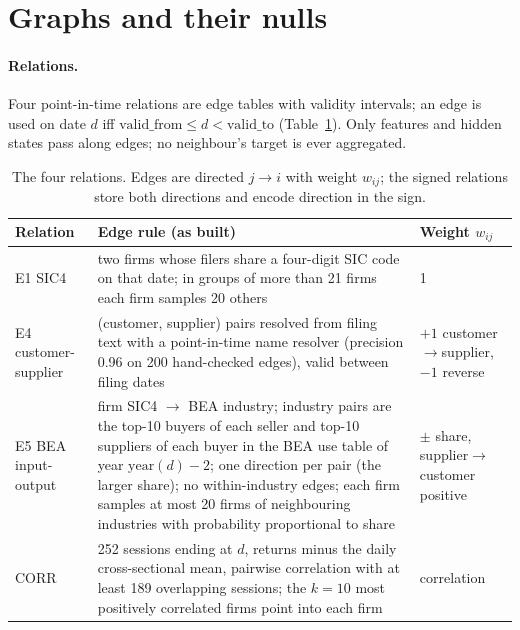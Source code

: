\section{Graphs and their nulls}\label{sec:graphs}

\paragraph{Relations.}
Four point-in-time relations are edge tables with validity intervals; an edge is used on date $d$ iff $\mathrm{valid\_from}\le d<\mathrm{valid\_to}$ (Table~\ref{tab:relations}). Only features and hidden states pass along edges; no neighbour's target is ever aggregated.

\begin{table}[t]
\centering\footnotesize
\setlength{\tabcolsep}{4pt}
\caption{The four relations. Edges are directed $j\to i$ with weight $w_{ij}$; the signed relations store both directions and encode direction in the sign.}
\label{tab:relations}
\begin{tabular}{@{}p{2.1cm}p{9.6cm}p{3.0cm}@{}}
\toprule
Relation & Edge rule (as built) & Weight $w_{ij}$ \\
\midrule
E1 SIC4 & two firms whose filers share a four-digit SIC code on that date; in groups of more than 21 firms each firm samples 20 others & 1 \\
E4 customer-supplier & (customer, supplier) pairs resolved from filing text with a point-in-time name resolver (precision 0.96 on 200 hand-checked edges), valid between filing dates & $+1$ customer$\to$supplier, $-1$ reverse \\
E5 BEA input-output & firm SIC4 $\to$ BEA industry; industry pairs are the top-10 buyers of each seller and top-10 suppliers of each buyer in the BEA use table of year $\mathrm{year}(d)-2$; one direction per pair (the larger share); no within-industry edges; each firm samples at most 20 firms of neighbouring industries with probability proportional to share & $\pm$ share, supplier$\to$customer positive \\
CORR & 252 sessions ending at $d$, returns minus the daily cross-sectional mean, pairwise correlation with at least 189 overlapping sessions; the $k=10$ most positively correlated firms point into each firm & correlation \\
\bottomrule
\end{tabular}
\end{table}

